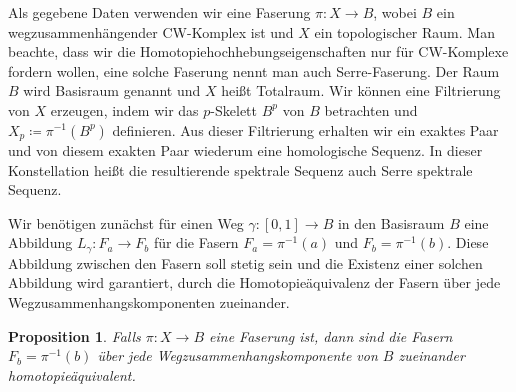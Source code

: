 \documentclass[12pt, hidelinks]{article}
\numberwithin{conj}{section}
\newtheorem{proposition}[conj]{Proposition}
\begin{document}
Als gegebene Daten verwenden wir eine Faserung $\pi: X \to B$, wobei $B$ ein wegzusammenhängender CW-Komplex ist und $X$ ein topologischer Raum. Man beachte, dass wir die Homotopiehochhebungseigenschaften nur für CW-Komplexe fordern wollen, eine solche Faserung nennt man auch Serre-Faserung. Der Raum $B$ wird Basisraum genannt und $X$ heißt Totalraum. Wir können eine Filtrierung von $X$ erzeugen, indem wir das $p$-Skelett $B^p$ von $B$ betrachten und $X_p \coloneq \pi^{-1}(B^p)$ definieren. Aus dieser Filtrierung erhalten wir ein exaktes Paar und von diesem exakten Paar wiederum eine homologische Sequenz. In dieser Konstellation heißt die resultierende spektrale Sequenz auch Serre spektrale Sequenz.

Wir benötigen zunächst für einen Weg $\gamma: [0,1] \to B$ in den Basisraum $B$ eine Abbildung $L_\gamma: F_a \to F_b$ für die Fasern $F_a = \pi^{-1}(a)$ und $F_b = \pi^{-1}(b)$. Diese Abbildung zwischen den Fasern soll stetig sein und die Existenz einer solchen Abbildung wird garantiert, durch die Homotopieäquivalenz der Fasern über jede Wegzusammenhangskomponenten zueinander.

\begin{proposition}
Falls $\pi: X \to B$ eine Faserung ist, dann sind die Fasern $F_b = \pi^{-1}(b)$ über jede Wegzusammenhangskomponente von $B$ zueinander homotopieäquivalent.
\end{proposition}
\end{document}
